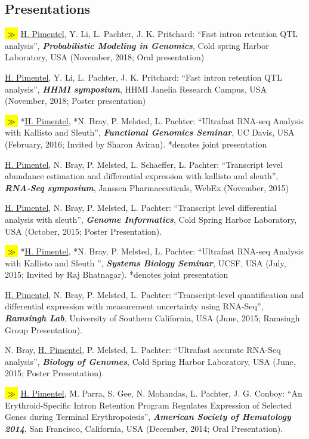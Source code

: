 \documentclass[overlapped]{res}
\newcommand{\hlc}[2][blue]{ {\sethlcolor{#1} \hl{#2}} }
\newcommand{\hlpub}{\hlc[Dandelion]{{\color{white}$\gg$} }}
\begin{document}
\begin{resume}
\section{\sc Presentations}

\hlpub \underline{H. Pimentel}, Y. Li, L. Pachter, J. K. Pritchard: ``Fast intron retention QTL analysis'', {\bf \emph{Probabilistic Modeling in Genomics}}, Cold spring Harbor Laboratory, USA (November, 2018; Oral presentation)

\underline{H. Pimentel}, Y. Li, L. Pachter, J. K. Pritchard: ``Fast intron retention QTL analysis'', {\bf \emph{HHMI symposium}}, HHMI Janelia Research Campus, USA (November, 2018; Poster presentation)

\hlpub *\underline{H. Pimentel}, *N. Bray, P. Melsted, L. Pachter: ``Ultrafast RNA-seq Analysis with Kallisto and Sleuth'', {\bf \emph{Functional Genomics Seminar}}, UC Davis, USA (February, 2016; Invited by Sharon Aviran). *denotes joint presentation

\underline{H. Pimentel}, N. Bray, P. Melsted, L. Schaeffer, L. Pachter: ``Transcript level abundance estimation and differential expression with kallisto and sleuth'', {\bf \emph{RNA-Seq symposium}}, Janssen Pharmaceuticals, WebEx (November, 2015)

\underline{H. Pimentel}, N. Bray, P. Melsted, L. Pachter: ``Transcript level differential analysis with sleuth'', {\bf \emph{Genome Informatics}}, Cold Spring Harbor
Laboratory, USA (October, 2015; Poster Presentation).

\hlpub *\underline{H. Pimentel}, *N. Bray, P. Melsted, L. Pachter: ``Ultrafast RNA-seq Analysis with Kallisto and Sleuth '', {\bf \emph{Systems Biology Seminar}}, UCSF, USA (July, 2015; Invited by Raj Bhatnagar). *denotes joint presentation

\underline{H. Pimentel}, N. Bray, P. Melsted, L. Pachter: ``Transcript-level
quantification and differential expression with measurement uncertainty using
RNA-Seq'', {\bf \emph{Ramsingh Lab}}, University of Southern California, USA (June,
2015; Ramsingh Group Presentation).

N. Bray, \underline{H. Pimentel}, P. Melsted, L. Pachter: ``Ultrafast accurate
RNA-Seq analysis'', {\bf \emph{Biology of Genomes}}, Cold Spring Harbor
Laboratory, USA (June, 2015; Poster Presentation).

\newpage

\hlpub \underline{H. Pimentel}, M. Parra, S. Gee, N. Mohandas, L. Pachter, J. G.
Conboy: ``An Erythroid-Specific Intron Retention Program Regulates Expression
of Selected Genes during Terminal Erythropoiesis'', {\bf \emph{American Society
    of Hematology 2014}}, San Francisco, California, USA (December, 2014; Oral
Presentation).


\end{resume}
\end{document}
